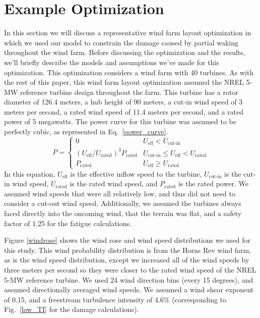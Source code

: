 \documentclass[11pt,letterpaper]{article}
\begin{document}
\section{Example Optimization}

In this section we will discuss a representative wind farm layout optimization in which we used our model to constrain the damage caused by partial waking throughout the wind farm. Before discussing the optimization and the results, we'll briefly describe the models and assumptions we've made for this optimization. This optimization considers a wind farm with 40 turbines. As with the rest of this paper, this wind farm layout optimization assumed the NREL 5-MW reference turbine design throughout the farm. This turbine has a rotor diameter of 126.4 meters, a hub height of 90 meters, a cut-in wind speed of 3 meters per second, a rated wind speed of 11.4 meters per second, and a rated power of 5 megawatts. The power curve for this turbine was assumed to be perfectly cubic, as represented in Eq.~\ref{power_curve}. 
% 
\begin{equation}
    P = \begin{cases} 
      0 &  U_\text{eff} < U_\text{cut-in} \\
      (U_\text{eff}/U_\text{rated})^3 P_\text{rated} &  U_\text{cut-in} \leq U_\text{eff} < U_\text{rated}\\
      P_\text{rated} & U_\text{eff} \geq U_\text{rated}
   \end{cases}
   \label{power_curve}
\end{equation}
% 
In this equation, $U_\text{eff}$ is the effective inflow speed to the turbine, $U_\text{cut-in}$ is the cut-in wind speed, $U_\text{rated}$ is the rated wind speed, and $P_\text{rated}$ is the rated power.
We assumed wind speeds that were all relatively low, and thus did not need to consider a cut-out wind speed.
Additionally, we assumed the turbines always faced directly into the oncoming wind, that the terrain was flat, and a safety factor of 1.25 for the fatigue calculations.

Figure \ref{windrose} shows the wind rose and wind speed distributions we used for this study. This wind probability distribution is from the Horns Rev wind farm, as is the wind speed distribution, except we increased all of the wind speeds by three meters per second so they were closer to the rated wind speed of the NREL 5-MW reference turbine. We used 24 wind direction bins (every 15 degrees), and assumed directionally averaged wind speeds. We assumed a wind shear exponent of 0.15, and a freestream turbulence intensity of 4.6\% (corresponding to Fig.~\ref{low_TI} for the damage calculations).
\end{document}
